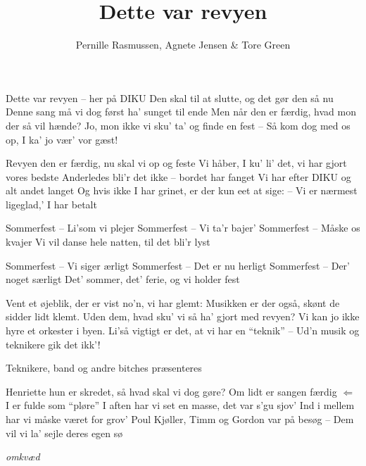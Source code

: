 \documentclass[10pt]{article}
\title{Dette var revyen}
\author{Pernille Rasmussen, Agnete Jensen \& Tore Green}
\begin{document}
\maketitle

\begin{song}

 Dette var revyen -- her på {\sc DIKU}
           Den skal til at slutte, og det gør den så nu
           Denne sang må vi dog først ha' sunget til ende
           Men når den er færdig, hvad mon der så vil hænde?
           Jo, mon ikke vi sku' ta' og finde en fest
           -- Så kom dog med os op, I ka' jo vær' vor gæst!

 Revyen den er færdig, nu skal vi op og feste
           Vi håber, I ku' li' det, vi har gjort vores bedste 
           Anderledes bli'r det ikke -- bordet har fanget
           Vi har efter DIKU og alt andet langet
           Og hvis ikke I har grinet, er der kun eet at sige:
           -- Vi er nærmest ligeglad,' I har betalt

 Sommerfest -- Li'som vi plejer
               Sommerfest -- Vi ta'r bajer'
               Sommerfest -- Måske os kvajer
               Vi vil danse hele natten, til det bli'r lyst

               Sommerfest -- Vi siger ærligt
               Sommerfest -- Det er nu herligt
               Sommerfest -- Der' noget særligt
               Det' sommer, det' ferie, og vi holder fest

 Vent et øjeblik, der er vist no'n, vi har glemt:
           Musikken er der også, skønt de sidder lidt klemt.
           Uden dem, hvad sku' vi så ha' gjort med revyen?
           Vi kan jo ikke hyre et orkester i byen.
           Li'så vigtigt er det, at vi har en ``teknik''
           -- Ud'n musik og teknikere gik det ikk'!

\scene Teknikere, band og andre bitches præsenteres

 Henriette hun er skredet, så hvad skal vi dog gøre?
           Om lidt er sangen færdig $\Leftarrow$ I er fulde som ``pløre''
           I aften har vi set en masse, det var s'gu sjov'
           Ind i mellem har vi måske været for grov'
           Poul Kjøller, Timm og Gordon var på besøg
           -- Dem vil vi la' sejle deres egen sø

{\em omkvæd} 

\end{song}
\end{document}
